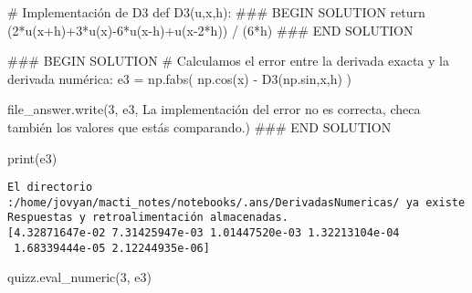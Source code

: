 \documentclass[
  letterpaper,
  DIV=11,
  numbers=noendperiod]{scrreprt}
\newenvironment{Shaded}{\begin{snugshade}}{\end{snugshade}}
\newcommand{\BuiltInTok}[1]{\textcolor[rgb]{0.00,0.23,0.31}{#1}}
\newcommand{\CommentTok}[1]{\textcolor[rgb]{0.37,0.37,0.37}{#1}}
\newcommand{\ControlFlowTok}[1]{\textcolor[rgb]{0.00,0.23,0.31}{#1}}
\newcommand{\DecValTok}[1]{\textcolor[rgb]{0.68,0.00,0.00}{#1}}
\newcommand{\KeywordTok}[1]{\textcolor[rgb]{0.00,0.23,0.31}{#1}}
\newcommand{\NormalTok}[1]{\textcolor[rgb]{0.00,0.23,0.31}{#1}}
\newcommand{\OperatorTok}[1]{\textcolor[rgb]{0.37,0.37,0.37}{#1}}
\newcommand{\RegionMarkerTok}[1]{\textcolor[rgb]{0.00,0.23,0.31}{#1}}
\newcommand{\StringTok}[1]{\textcolor[rgb]{0.13,0.47,0.30}{#1}}
\begin{document}
\begin{Shaded}
\begin{Highlighting}[]
\CommentTok{\# Implementación de D3}
\KeywordTok{def}\NormalTok{ D3(u,x,h):}
    \CommentTok{\#\#\# }\RegionMarkerTok{BEGIN}\CommentTok{ SOLUTION}
    \ControlFlowTok{return}\NormalTok{ (}\DecValTok{2}\OperatorTok{*}\NormalTok{u(x}\OperatorTok{+}\NormalTok{h)}\OperatorTok{+}\DecValTok{3}\OperatorTok{*}\NormalTok{u(x)}\OperatorTok{{-}}\DecValTok{6}\OperatorTok{*}\NormalTok{u(x}\OperatorTok{{-}}\NormalTok{h)}\OperatorTok{+}\NormalTok{u(x}\OperatorTok{{-}}\DecValTok{2}\OperatorTok{*}\NormalTok{h)) }\OperatorTok{/}\NormalTok{ (}\DecValTok{6}\OperatorTok{*}\NormalTok{h)}
    \CommentTok{\#\#\# }\RegionMarkerTok{END}\CommentTok{ SOLUTION}
\end{Highlighting}
\end{Shaded}

\begin{Shaded}
\begin{Highlighting}[]
\CommentTok{\#\#\# }\RegionMarkerTok{BEGIN}\CommentTok{ SOLUTION}
\CommentTok{\# Calculamos el error entre la derivada exacta y la derivada numérica:}
\NormalTok{e3 }\OperatorTok{=}\NormalTok{ np.fabs( np.cos(x) }\OperatorTok{{-}}\NormalTok{ D3(np.sin,x,h) )}

\NormalTok{file\_answer.write(}\StringTok{\textquotesingle{}3\textquotesingle{}}\NormalTok{, e3, }\StringTok{\textquotesingle{}La implementación del error no es correcta, checa también los valores que estás comparando.\textquotesingle{}}\NormalTok{)}
\CommentTok{\#\#\# }\RegionMarkerTok{END}\CommentTok{ SOLUTION}

\BuiltInTok{print}\NormalTok{(e3)}
\end{Highlighting}
\end{Shaded}

\begin{verbatim}
El directorio :/home/jovyan/macti_notes/notebooks/.ans/DerivadasNumericas/ ya existe
Respuestas y retroalimentación almacenadas.
[4.32871647e-02 7.31425947e-03 1.01447520e-03 1.32213104e-04
 1.68339444e-05 2.12244935e-06]
\end{verbatim}

\begin{Shaded}
\begin{Highlighting}[]
\NormalTok{quizz.eval\_numeric(}\StringTok{\textquotesingle{}3\textquotesingle{}}\NormalTok{, e3)}
\end{Highlighting}
\end{Shaded}
\end{document}
